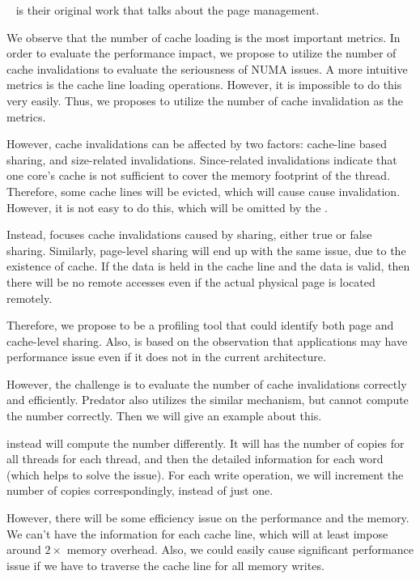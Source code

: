 ~\cite{Bolosky:1989:SBE:74850.74854} is their original work that talks about the page management. 


We observe that the number of cache loading is the most important metrics.
In order to evaluate the performance impact, we propose to utilize the number of cache invalidations to evaluate the seriousness of NUMA issues. A more intuitive metrics is the cache line loading operations. However, it is impossible to do this very easily. Thus, we proposes to utilize the number of cache invalidation as the metrics. 


However, cache invalidations can be affected by two factors: cache-line based sharing, and size-related invalidations. 
Since-related invalidations indicate that one core's cache is not sufficient to cover the memory footprint of the thread. Therefore, some cache lines will be evicted, which will cause cause invalidation. However, it is not easy to do this, which will be omitted by the \NP{}. 

Instead, \NP{} focuses cache invalidations caused by sharing, either true or false sharing. Similarly, page-level sharing will end up with the same issue, due to the existence of cache. If the data is held in the cache line and the data is valid, then there will be no remote accesses even if the actual physical page is located remotely. 

Therefore, we propose \NP{} to be a profiling tool that could identify both page and cache-level sharing. Also, \NP{} is based on the observation that applications may have performance issue even if it does not in the current architecture. 

However, the challenge is to evaluate the number of cache invalidations correctly and efficiently. Predator also utilizes the similar mechanism, but cannot compute the number correctly. Then we will give an example about this. 

\NP{} instead will compute the number differently. It will has the number of copies for all threads for each thread, and then the detailed information for each word (which helps to solve the issue). For each write operation, we will increment the number of copies correspondingly, instead of just one.

However, there will be some efficiency issue on the performance and the memory. We can't have the information for each cache line, which will at least impose around $2\times$ memory overhead. Also, we could easily cause significant performance issue if we have to traverse the cache line for all memory writes. 
 

